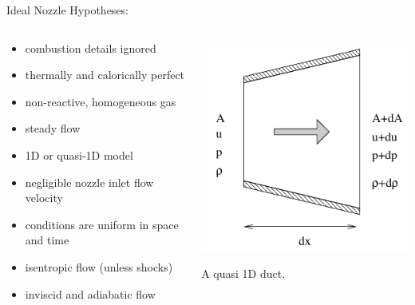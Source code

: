 \documentclass[
  ignorenonframetext,
]{beamer}
\providecommand{\tightlist}{%
  \setlength{\itemsep}{0pt}\setlength{\parskip}{0pt}}\usepackage{longtable,booktabs,array}
\begin{document}
\begin{frame}{Ideal Nozzle}
\protect\hypertarget{ideal-nozzle}{}
Hypotheses:

\begin{columns}[T]
\begin{column}{0.5\textwidth}
\begin{itemize}
\tightlist
\item
  combustion details ignored
\item
  thermally and calorically perfect
\item
  non-reactive, homogeneous gas
\item
  steady flow
\item
  1D or quasi-1D model
\item
  negligible nozzle inlet flow velocity
\item
  conditions are uniform in space and time
\item
  isentropic flow (unless shocks)
\item
  inviscid and adiabatic flow
\end{itemize}
\end{column}

\begin{column}{0.5\textwidth}
\includegraphics{figs/fig16.2.png}

A quasi 1D duct.
\end{column}
\end{columns}
\end{frame}
\end{document}
